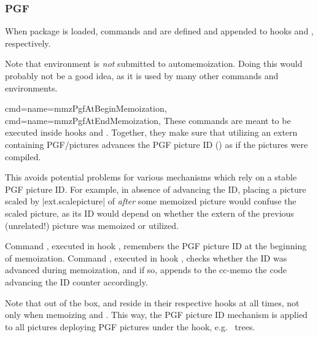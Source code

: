 \documentclass[a4paper,11pt]{article}
\begin{document}
\subsubsection{PGF}

When package \PGF is loaded, commands 
and  are defined and appended to hooks
 and , respectively.

Note that environment  is \emph{not} submitted to
automemoization.  Doing this would probably not be a good idea, as it is used
by many other commands and environments.


\begin{doc}{
    cmd={name=mmzPgfAtBeginMemoization},
    cmd={name=mmzPgfAtEndMemoization},
  }
  These commands are meant to be executed inside hooks  and .  Together, they make sure
  that utilizing an extern containing PGF/\TikZ pictures advances the PGF
  picture ID () as if the pictures were compiled.
  
  This avoids potential problems for various mechanisms which rely on a stable
  PGF picture ID.  For example, in absence of advancing the ID, placing a \TikZ
  picture scaled by |ext.scalepicture| of  \emph{after} some
  memoized \TikZ picture would confuse the scaled picture, as its ID would
  depend on whether the extern of the previous (unrelated!)  picture was
  memoized or utilized.

  Command , executed in hook , remembers the PGF picture ID at the beginning of memoization.
  Command , executed in hook , checks whether the ID was advanced during memoization, and if
  so, appends to the cc-memo the code advancing the ID counter accordingly.

  Note that out of the box,  and
   reside in their respective hooks at all
  times, not only when memoizing  and .  This
  way, the PGF picture ID mechanism is applied to all pictures deploying PGF
  pictures under the hook, e.g.\  trees.
\end{doc}
\end{document}
